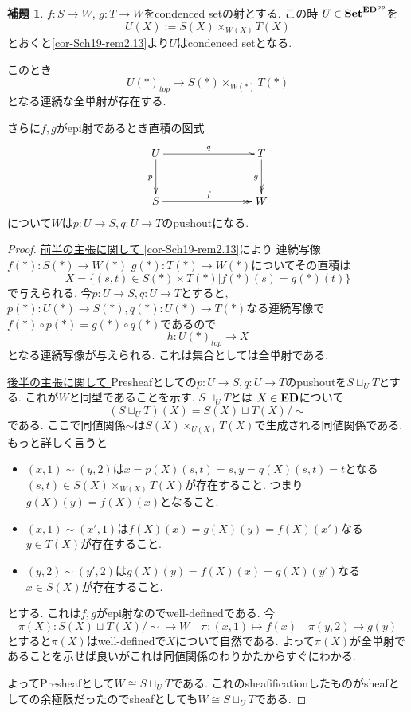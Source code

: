\documentclass[dvipdfmx,a4paper,11pt]{report}
\theoremstyle{definition}
\newtheorem{lem}[thm]{補題}
\begin{document}
 \begin{tcolorbox}
 [colback = white, colframe = green!35!black, fonttitle = \bfseries,breakable = true]
  \begin{lem}\cite[Lemma 3.6.2]{Bar22}
\label{lem-ep-pullback}
$f: S \to W$, $g : T \to W$をcondenced setの射とする.
この時
 $U  \in {\bf Set}^{ { \bf ED }^{op}}$を
 $$
 U(X) := S(X) \times_{W(X)} T(X) 
 $$
とおくと\ref{cor-Sch19-rem2.13}より$U$はcondenced setとなる.  %

このとき$$U(\ast)_{top} \to S(\ast) \times_{W(\ast)} T(\ast)$$となる連続な全単射が存在する.

さらに$f, g$がepi射であるとき直積の図式
 \begin{equation*}
 \xymatrix@C=80pt@R=30pt{
U \ar@{->}[r]^{q}
\ar@{->}[d]_{p}
&T \ar@{->>}[d]_{g}
\\
S\ar@{->>}[r]^{f}
&W
 \\   
}
\end{equation*}
について$W$は$p : U \to S, q: U \to T$のpushoutになる. 

 \end{lem}
  \end{tcolorbox}
 \begin{proof}
   \underline{前半の主張に関して }
   \ref{cor-Sch19-rem2.13}により
連続写像$f(\ast) : S(\ast) \to W(\ast)$ $g(\ast) : T(\ast) \to W(\ast)$についてその直積は
 $$
 X =  \{(s,t) \in S(\ast) \times T(\ast) | f(\ast)(s) = g(\ast)(t) \}
 $$
 で与えられる. 今$p : U \to S, q : U \to T$とすると, $p(\ast) : U(\ast)  \to S(\ast) , q(\ast)  : U (\ast) \to T(\ast) $なる連続写像で$f(\ast)\circ p(\ast) = g(\ast) \circ q(\ast)$であるので
 $$
 h : U(\ast)_{top} \to  X
 $$
 となる連続写像が与えられる.  これは集合としては全単射である.
 
   \underline{後半の主張に関して }
 Presheafとしての$p : U \to S, q: U \to T$のpushoutを$S \sqcup_{U}T$とする.
 これが$W$と同型であることを示す. 
$S \sqcup_{U}T$とは
$X \in {\bf ED}$について
$$
(S \sqcup_{U}T)(X)
=
S(X) \sqcup T(X)/\sim
$$
である. ここで同値関係$\sim$は$S(X) \times_{U(X)} T(X)$で生成される同値関係である.
もっと詳しく言うと
\begin{itemize}
\item $(x,1) \sim (y , 2)$は$x=p(X)(s,t)=s, y=q(X)(s,t)=t$となる$(s,t) \in S(X) \times_{W(X)} T(X) $が存在すること. つまり$g(X)(y)=f(X)(x)$となること. 
\item $(x,1) \sim (x', 1)$は$f(X)(x)=g(X)(y)=f(X)(x')$なる$y \in T(X)$が存在すること.
\item $(y,2) \sim (y' , 2)$は$g(X)(y)=f(X)(x)=g(X)(y')$なる$x \in S(X)$が存在すること.
\end{itemize}
とする. 
これは$f, g$がepi射なのでwell-definedである. 
今
$$
\pi(X): S(X) \sqcup T(X)/\sim \to W
\quad
\pi : (x,1) \mapsto f(x)
\quad
\pi (y,2) \mapsto g(y)
$$
とすると$\pi(X)$はwell-definedで$X$について自然である.
よって$\pi(X)$が全単射であることを示せば良いがこれは同値関係のわりかたからすぐにわかる. 

よってPresheafとして$W \cong S \sqcup_{U}T$である.
これのsheafificationしたものがsheafとしての余極限だったのでsheafとしても$W \cong S \sqcup_{U}T$である. 
 \end{proof}
 
\end{document}
